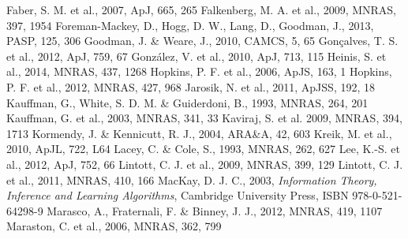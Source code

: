 \documentclass{mn2e}
\begin{document}
\begin{thebibliography}{}
 Faber, S. M. et al., 2007, ApJ, 665, 265
 Falkenberg, M. A. et al., 2009, MNRAS, 397, 1954
 Foreman-Mackey, D., Hogg, D. W., Lang, D., Goodman, J., 2013, PASP, 125, 306
 Goodman, J. \& Weare, J., 2010, CAMCS, 5, 65
 Gon\c calves, T. S. et al., 2012, ApJ, 759, 67
 Gonz\'alez, V. et al., 2010, ApJ, 713, 115
 Heinis, S. et al., 2014, MNRAS, 437, 1268
 Hopkins, P. F. et al., 2006, ApJS, 163, 1
 Hopkins, P. F. et al., 2012, MNRAS, 427, 968
 Jarosik, N. et al., 2011, ApJSS, 192, 18
 Kauffman, G., White, S. D. M. \& Guiderdoni, B., 1993, MNRAS, 264, 201
 Kauffman, G. et al., 2003, MNRAS, 341, 33
 Kaviraj, S. et al. 2009, MNRAS, 394, 1713
 Kormendy, J. \& Kennicutt, R. J., 2004, ARA\&A, 42, 603
 Kreik, M. et al., 2010, ApJL, 722, L64
 Lacey, C. \& Cole, S., 1993, MNRAS, 262, 627
 Lee, K.-S. et al., 2012, ApJ, 752, 66
 Lintott, C. J. et al., 2009, MNRAS, 399, 129
 Lintott, C. J. et al., 2011, MNRAS, 410, 166
 MacKay, D. J. C., 2003, \emph{Information Theory, Inference and Learning Algorithms}, Cambridge University Press, ISBN 978-0-521-64298-9
 Marasco, A., Fraternali, F. \& Binney, J. J., 2012, MNRAS, 419, 1107
 Maraston, C. et al., 2006, MNRAS, 362, 799

\end{thebibliography}
\end{document}
